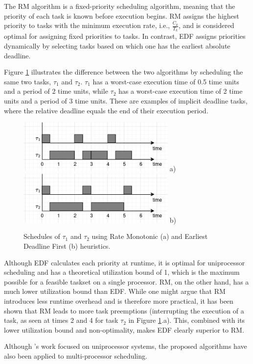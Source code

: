 The RM algorithm is a fixed-priority scheduling algorithm, 
meaning that the priority of each task is known before execution 
begins. RM assigns the highest priority to tasks with the minimum 
execution rate, i.e., $\frac{C_k}{T_k}$, and is considered optimal 
for assigning fixed priorities to tasks. In contrast, EDF assigns 
priorities dynamically by selecting tasks based on which one has 
the earliest absolute deadline.

Figure \ref{fig:edf_rm_examples} illustrates the difference 
between the two algorithms by scheduling the same two tasks, 
$\tau_1$ and $\tau_2$. $\tau_1$ has a worst-case execution time of 0.5 time units 
and a period of 2 time units, while $\tau_2$ has a worst-case execution 
time of 2 time units and a period of 3 time units. These are 
examples of implicit deadline tasks, where the relative deadline 
equals the end of their execution period. 

\begin{figure}
    \centering
    \includegraphics[width=\linewidth, height=100px]{images/schedule_rm.png}
    a)
    \includegraphics[width=\linewidth, height=100px]{images/schedule_edf.png}
    b)
    \caption{Schedules of $\tau_1$ and $\tau_2$ using Rate Monotonic (a)
    and Earliest Deadline First (b) heuristics.}
    \label{fig:edf_rm_examples}
\end{figure}

Although EDF calculates each priority at runtime, it is optimal 
for uniprocessor scheduling and has a theoretical utilization bound 
of 1, which is the maximum possible for a feasible taskset on a 
single processor. RM, on the other hand, has a much lower 
utilization bound than EDF. While one might argue that RM introduces 
less runtime overhead and is therefore more practical, it has been 
shown that RM leads to more task preemptions (interrupting the 
execution of a task, as seen at times 2 and 4 for task $\tau_2$ in 
Figure \ref{fig:edf_rm_examples}.a). This, combined with its lower 
utilization bound and non-optimality, makes EDF clearly superior to 
RM\cite{buttazzo2005RMvsEDF}.

Although \cite{liu1973scheduling}'s work focused on uniprocessor 
systems, the proposed algorithms have also been applied to 
multi-processor scheduling.